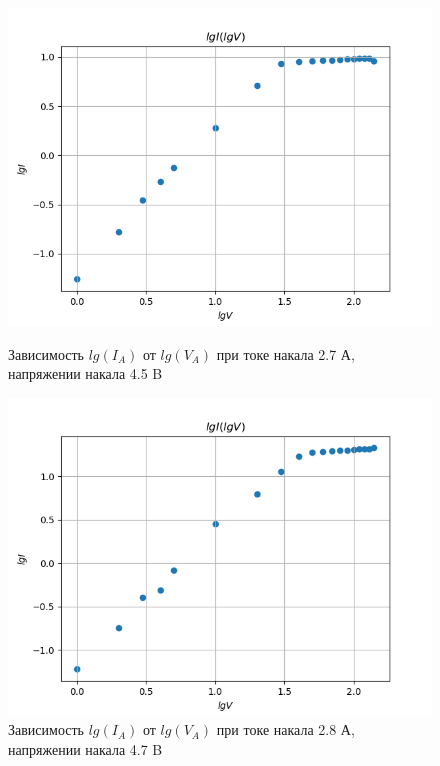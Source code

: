 \documentclass[a4paper]{article}
\begin{document}
\begin{figure}[h]
\begin{center}
\begin{minipage}[h]{0.45\linewidth}
\includegraphics[width=1\linewidth]{./Diode/graph_5.png}
\caption{Зависимость $lg(I_A)$ от $lg(V_A)$ при токе накала 2.7 А, напряжении накала 4.5 B} %
\end{minipage}
\hfill 
\begin{minipage}[h]{0.45\linewidth}
\includegraphics[width=1\linewidth]{./Diode/graph_6.png}
\caption{Зависимость $lg(I_A)$ от $lg(V_A)$ при токе накала 2.8 А, напряжении накала 4.7 B }
\label{ris:experimcoded}
\end{minipage}
\end{center}
\end{figure}
\end{document}
